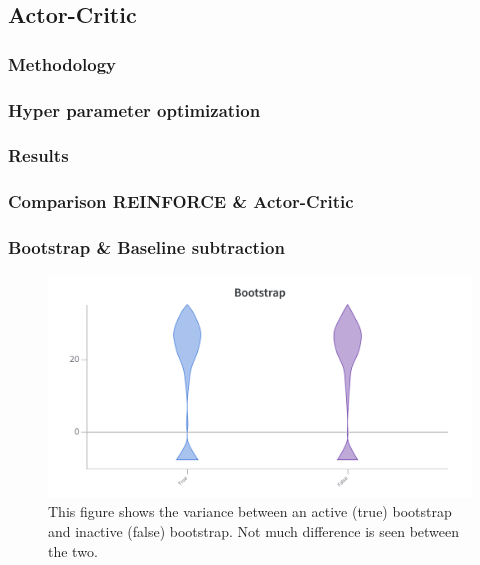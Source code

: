 \documentclass{article}
\begin{document}
\subsection{Actor-Critic}
\label{A-Actor-Critic}


\subsubsection{Methodology}
\label{AC-Method}

\subsubsection{Hyper parameter optimization}
\label{AC-HPO}

\subsubsection{Results}
\label{AC-Results}

\subsubsection{Comparison REINFORCE \& Actor-Critic}
\label{R/AC-Comparison}


\subsubsection{Bootstrap \& Baseline subtraction }
% 
\begin{figure}[htbp]
    \centering
    \includegraphics[width=\linewidth]{figs/boostrap.png}
    \caption{This figure shows the variance between an active (true) bootstrap and inactive (false) bootstrap. Not much difference is seen between the two.}
    \label{fig:bootstrap}
\end{figure}
\end{document}
